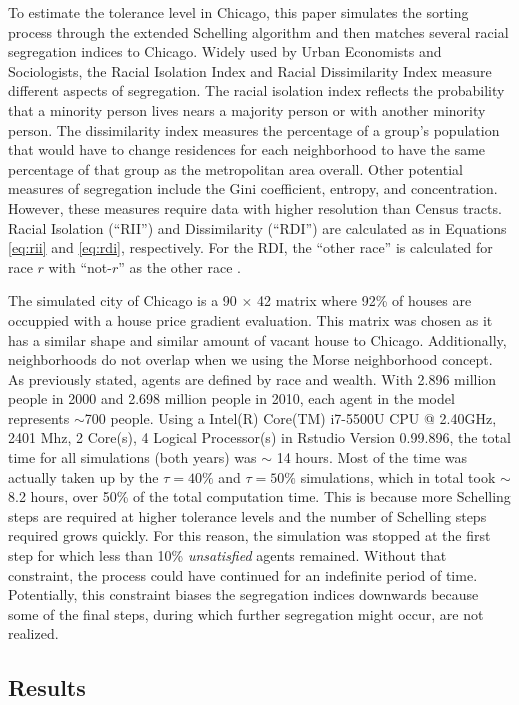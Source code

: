 \documentclass[11pt]{asaproc}
\newcommand{\1}{\mathbb{1}}
\begin{document}
To estimate the tolerance level in Chicago, this paper simulates the sorting process through the extended Schelling algorithm and then matches several racial segregation indices to Chicago. Widely used by Urban Economists and Sociologists, the Racial Isolation Index and Racial Dissimilarity Index measure different aspects of segregation. The racial isolation index reflects the probability that a minority person lives nears a majority person or with another minority person. The dissimilarity index measures the percentage of a group's population that would have to change residences for each neighborhood to have the same percentage of that group as the metropolitan area overall. Other potential measures of segregation include the Gini coefficient, entropy, and concentration. However, these measures require data with higher resolution than Census tracts. Racial Isolation (``RII'') and Dissimilarity (``RDI'') are calculated as in Equations \ref{eq:rii} and \ref{eq:rdi}, respectively. For the RDI, the ``other race'' is calculated for race $r$ with ``not-$r$'' as the other race \citep{cutler99}.

The simulated city of Chicago is a 90 $\times$ 42 matrix where 92\% of houses are occuppied with a house price gradient evaluation. This matrix was chosen as it has a similar shape and similar amount of vacant house to Chicago. Additionally, neighborhoods do not overlap when we using the Morse neighborhood concept. As previously stated, agents are defined by race and wealth. With 2.896 million people in 2000 and 2.698 million people in 2010, each agent in the model represents $\sim$700 people. Using a Intel(R) Core(TM) i7-5500U CPU @ 2.40GHz, 2401 Mhz, 2 Core(s), 4 Logical Processor(s) in Rstudio Version 0.99.896, the total time for all simulations (both years) was $\sim$ 14 hours. Most of the time was actually taken up by the $\tau = 40\%$ and  $\tau = 50\%$ simulations, which in total took $\sim$ 8.2 hours, over 50\% of the total computation time. This is because more Schelling steps are required at higher tolerance levels and the number of Schelling steps required grows quickly. For this reason, the simulation was stopped at the first step for which less than 10\% \textit{unsatisfied} agents remained. Without that constraint, the process could have continued for an indefinite period of time. Potentially, this constraint biases the segregation indices downwards because some of the final steps, during which further segregation might occur, are not realized. 

\subsection{Results}
\end{document}
